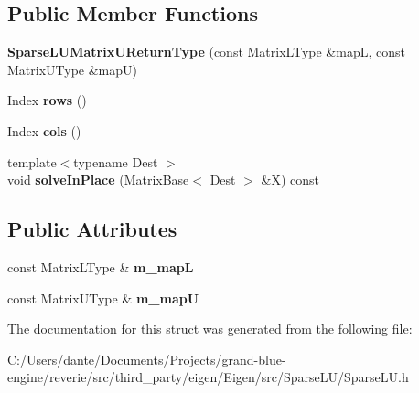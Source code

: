 \subsection*{Public Member Functions}
\begin{DoxyCompactItemize}
\item 
\mbox{\label{struct_eigen_1_1_sparse_l_u_matrix_u_return_type_a6d2a7de76dc233c14d6e07a13566417e}} 
{\bfseries Sparse\+L\+U\+Matrix\+U\+Return\+Type} (const Matrix\+L\+Type \&mapL, const Matrix\+U\+Type \&mapU)
\item 
\mbox{\label{struct_eigen_1_1_sparse_l_u_matrix_u_return_type_ad990ba846aca9d220361cbd95f675d40}} 
Index {\bfseries rows} ()
\item 
\mbox{\label{struct_eigen_1_1_sparse_l_u_matrix_u_return_type_a105fbf78cea564052da04e32bbc5c450}} 
Index {\bfseries cols} ()
\item 
\mbox{\label{struct_eigen_1_1_sparse_l_u_matrix_u_return_type_aa32c47f4e184a041db3c4112339d3185}} 
{\footnotesize template$<$typename Dest $>$ }\\void {\bfseries solve\+In\+Place} (\mbox{\hyperlink{class_eigen_1_1_matrix_base}{Matrix\+Base}}$<$ Dest $>$ \&X) const
\end{DoxyCompactItemize}
\subsection*{Public Attributes}
\begin{DoxyCompactItemize}
\item 
\mbox{\label{struct_eigen_1_1_sparse_l_u_matrix_u_return_type_aaccd71d2e7df74215e856d0a6663548c}} 
const Matrix\+L\+Type \& {\bfseries m\+\_\+mapL}
\item 
\mbox{\label{struct_eigen_1_1_sparse_l_u_matrix_u_return_type_a1353bf01e9f90d82f1d4ae4c67af1843}} 
const Matrix\+U\+Type \& {\bfseries m\+\_\+mapU}
\end{DoxyCompactItemize}


The documentation for this struct was generated from the following file\+:\begin{DoxyCompactItemize}
\item 
C\+:/\+Users/dante/\+Documents/\+Projects/grand-\/blue-\/engine/reverie/src/third\+\_\+party/eigen/\+Eigen/src/\+Sparse\+L\+U/Sparse\+L\+U.\+h\end{DoxyCompactItemize}

